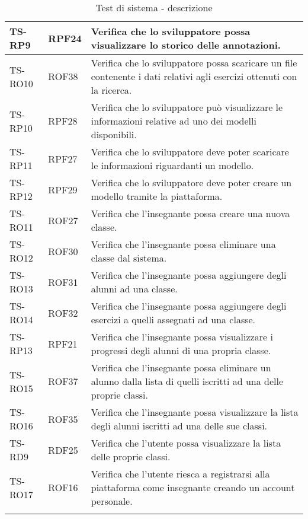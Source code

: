 \begin{longtable}{|>{\centering\arraybackslash}m{1.6cm}|>{\centering\arraybackslash}m{1.7cm}|m{6.41cm}|}
		TS-RP9		
		& RPF24 
		& Verifica che lo sviluppatore possa visualizzare lo storico delle annotazioni. 
		\\ \hline
		\rowcolor{LightGray}
		TS-RO10
		& ROF38 
		& Verifica che lo sviluppatore possa scaricare un file contenente i dati relativi agli esercizi ottenuti con la ricerca.
		\\ \hline
		TS-RP10		
		& RPF28 
		& Verifica che lo sviluppatore può visualizzare le informazioni relative ad uno dei modelli disponibili. 
		\\ \hline
		\rowcolor{LightGray}
		TS-RP11		
		& RPF27 
		& Verifica che lo sviluppatore deve poter scaricare le informazioni riguardanti un modello. 
		\\ \hline
		TS-RP12		
		& RPF29 
		& Verifica che lo sviluppatore deve poter creare un modello tramite la piattaforma. 
		\\ \hline	
		\rowcolor{LightGray}
		TS-RO11	
		& ROF27 
		& Verifica che l'insegnante possa creare una nuova classe. 
		\\ \hline
		TS-RO12	
		& ROF30 
		& Verifica che l'insegnante possa eliminare una classe dal sistema. 
		\\ \hline
		\rowcolor{LightGray}
		TS-RO13
		& ROF31 
		& Verifica che l'insegnante possa aggiungere degli alunni ad una classe. 
		\\ \hline
		TS-RO14
		& ROF32 
		& Verifica che l'insegnante possa aggiungere degli esercizi a quelli assegnati ad una classe. 
		\\ \hline
		\rowcolor{LightGray}
		TS-RP13
		& RPF21 
		& Verifica che l'insegnante possa visualizzare i progressi degli alunni di una propria classe.
		\\ \hline
		TS-RO15
		& ROF37 
		& Verifica che l'insegnante possa eliminare un alunno dalla lista di quelli iscritti ad una delle proprie classi. 
		\\ \hline
		\rowcolor{LightGray}
		TS-RO16	
		& ROF35 
		& Verifica che l'insegnante possa visualizzare la lista degli alunni iscritti ad una delle sue classi. 
		\\ \hline
		TS-RD9
		& RDF25 
		& Verifica che l'utente possa visualizzare la lista delle proprie classi. 
		\\ \hline
		\rowcolor{LightGray}
		TS-RO17
		& ROF16
		& Verifica che l'utente riesca a registrarsi alla piattaforma come insegnante creando un account personale. 
		\\ \hline
		
		\caption{Test di sistema - descrizione}
\end{longtable}


